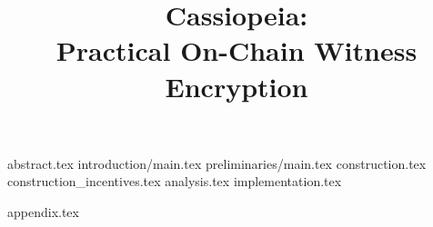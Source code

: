 \documentclass[runningheads]{llncs}
\begin{document}
\title{Cassiopeia:\\
Practical On-Chain Witness Encryption
}
\author{}
\institute{}

\maketitle              %

{abstract.tex}
{introduction/main.tex}
{preliminaries/main.tex}
{construction.tex}
{construction_incentives.tex}
{analysis.tex}
{implementation.tex}

\nocite{momo}


{appendix.tex}
\end{document}
